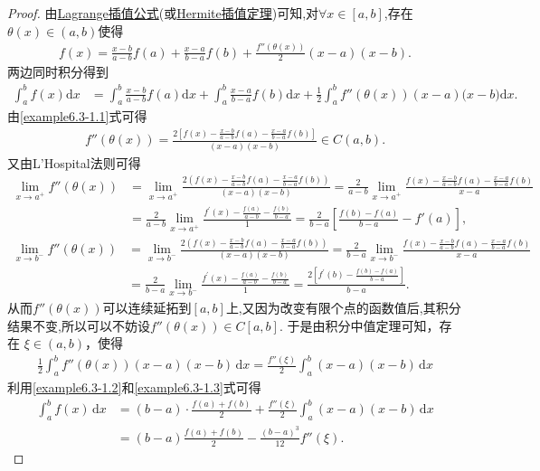 \documentclass[../../main.tex]{subfiles}
\begin{document}
\begin{proof}
由\hyperref[proposition:Lagrange插值公式]{Lagrange插值公式}(或\hyperref[theorem:Hermite插值定理]{Hermite插值定理})可知,对$\forall x\in [a,b]$,存在$\theta (x)\in (a,b)$使得
\begin{align}\label{example6.3-1.1}
f(x) = \frac{x - b}{a - b} f(a) + \frac{x - a}{b - a} f(b) + \frac{f''(\theta (x))}{2} (x - a)(x - b).
\end{align}
两边同时积分得到
\begin{align}
\int_a^b{f(x)\mathrm{d}x}&=\int_a^b{\frac{x-b}{a-b}f(a)\mathrm{d}x}+\int_a^b{\frac{x-a}{b-a}f(b)\mathrm{d}x}+\frac{1}{2}\int_a^b{f'' (\theta (x) )(x-a)(x-b})\mathrm{d}x.\label{example6.3-1.2}
\end{align}
由\eqref{example6.3-1.1}式可得
\begin{align*}
f'' (\theta (x) )=\frac{2\left[ f\left( x \right) -\frac{x-b}{a-b}f(a)-\frac{x-a}{b-a}f\left( b \right) \right]}{(x-a)(x-b)}\in C\left( a,b \right) .
\end{align*}
又由L'Hospital法则可得
\begin{align*}
\underset{x\rightarrow a^+}{\lim}f'' \left( \theta \left( x \right) \right) &=\underset{x\rightarrow a^+}{\lim}\frac{2\left( f\left( x \right) -\frac{x-b}{a-b}f(a)-\frac{x-a}{b-a}f\left( b \right) \right)}{(x-a)(x-b)}=\frac{2}{a-b}\underset{x\rightarrow a^+}{\lim}\frac{f\left( x \right) -\frac{x-b}{a-b}f(a)-\frac{x-a}{b-a}f\left( b \right)}{x-a}
\\
&=\frac{2}{a-b}\lim_{x\rightarrow a^+} \frac{f^{\prime}(x)-\frac{f(a)}{a-b}-\frac{f(b)}{b-a}}{1}=\frac{2}{b-a}\left[ \frac{f\left( b \right) -f\left( a \right)}{b-a}-f' \left( a \right) \right] ,   
\end{align*}
\begin{align*}
\underset{x\rightarrow b^-}{\lim}f'' \left( \theta \left( x \right) \right) &=\underset{x\rightarrow b^-}{\lim}\frac{2\left( f(x)-\frac{x-b}{a-b}f(a)-\frac{x-a}{b-a}f(b) \right)}{(x-a)(x-b)}=\frac{2}{b-a}\underset{x\rightarrow b^-}{\lim}\frac{f\left( x \right) -\frac{x-b}{a-b}f(a)-\frac{x-a}{b-a}f\left( b \right)}{x-a}
\\
&=\frac{2}{b-a}\lim_{x\rightarrow b^-} \frac{f^{\prime}(x)-\frac{f(a)}{a-b}-\frac{f(b)}{b-a}}{1}=\frac{2\left[ f^{\prime}(b)-\frac{f(b)-f(a)}{b-a} \right]}{b-a}.   
\end{align*}
从而$f'' \left( \theta \left( x \right) \right)$可以连续延拓到$[a,b]$上,又因为改变有限个点的函数值后,其积分结果不变,所以可以不妨设$f''(\theta(x))\in C[a,b]$.
于是由积分中值定理可知，存在 $\xi \in (a, b)$，使得
\begin{align}
\frac{1}{2} \int_a^b f''(\theta (x)) (x-a)(x-b) \, \mathrm{d}x = \frac{f''(\xi)}{2} \int_a^b (x-a)(x-b) \, \mathrm{d}x \label{example6.3-1.3}
\end{align}
利用\eqref{example6.3-1.2}和\eqref{example6.3-1.3}式可得
\begin{align*}
\int_a^b f(x) \, \mathrm{d}x &= (b-a) \cdot \frac{f(a) + f(b)}{2} + \frac{f''(\xi)}{2} \int_a^b (x-a)(x-b) \, \mathrm{d}x \\
&= (b-a) \frac{f(a) + f(b)}{2} - \frac{(b-a)^3}{12} f''(\xi). 
\end{align*}
\end{proof}
\end{document}
